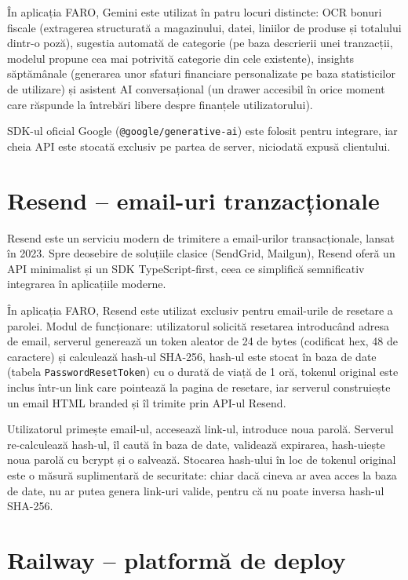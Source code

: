 \documentclass[12pt,a4paper,oneside]{report}
\begin{document}
În aplicația FARO, Gemini este utilizat în patru locuri distincte: OCR bonuri fiscale (extragerea structurată a magazinului, datei, liniilor de produse și totalului dintr-o poză), sugestia automată de categorie (pe baza descrierii unei tranzacții, modelul propune cea mai potrivită categorie din cele existente), insights săptămânale (generarea unor sfaturi financiare personalizate pe baza statisticilor de utilizare) și asistent AI conversațional (un drawer accesibil în orice moment care răspunde la întrebări libere despre finanțele utilizatorului).

SDK-ul oficial Google (\texttt{@google/generative-ai}) este folosit pentru integrare, iar cheia API este stocată exclusiv pe partea de server, niciodată expusă clientului.

\section{Resend -- email-uri tranzacționale}

Resend este un serviciu modern de trimitere a email-urilor transacționale, lansat în 2023. Spre deosebire de soluțiile clasice (SendGrid, Mailgun), Resend oferă un API minimalist și un SDK TypeScript-first, ceea ce simplifică semnificativ integrarea în aplicațiile moderne. \cite{ref:resend}

În aplicația FARO, Resend este utilizat exclusiv pentru email-urile de resetare a parolei. Modul de funcționare: utilizatorul solicită resetarea introducând adresa de email, serverul generează un token aleator de 24 de bytes (codificat hex, 48 de caractere) și calculează hash-ul SHA-256, hash-ul este stocat în baza de date (tabela \texttt{PasswordResetToken}) cu o durată de viață de 1 oră, tokenul original este inclus într-un link care pointează la pagina de resetare, iar serverul construiește un email HTML branded și îl trimite prin API-ul Resend.

Utilizatorul primește email-ul, accesează link-ul, introduce noua parolă. Serverul re-calculează hash-ul, îl caută în baza de date, validează expirarea, hash-uiește noua parolă cu bcrypt și o salvează. Stocarea hash-ului în loc de tokenul original este o măsură suplimentară de securitate: chiar dacă cineva ar avea acces la baza de date, nu ar putea genera link-uri valide, pentru că nu poate inversa hash-ul SHA-256.

\section{Railway -- platformă de deploy}
\end{document}
